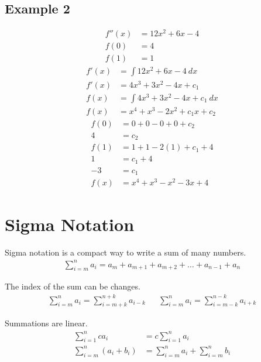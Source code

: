 \documentclass{article}
\theoremstyle{mytheoremstyle}
\theoremstyle{mytheoremstyle}
\theoremstyle{myproblemstyle}
\begin{document}
    \subsection*{Example 2}
    \begin{align*}
        f''(x) &= 12x^2 + 6x - 4 \\
        f(0)   &= 4 \\
        f(1)   &= 1
    \end{align*}
    \begin{align*}
        f'(x) &= \int 12x^2 + 6x - 4 \ dx \\
        f'(x) &= 4x^3 + 3x^2 - 4x + c_1 \\
        f(x)  &= \int 4x^3 + 3x^2 - 4x + c_1 \ dx \\
        f(x)  &= x^4 + x^3 -2x^2 + c_1x + c_2
    \end{align*}
    \begin{align*}
        f(0) &= 0 + 0 - 0 + 0 + c_2 \\
        4    &= c_2 \\
        f(1) &= 1 + 1 - 2(1) + c_1 + 4 \\
        1    &= c_1 + 4 \\
        -3   &=  c_1 \\
        f(x) &= x^4 + x^3 -x^2 - 3x + 4
    \end{align*}


    \section*{Sigma Notation}
    Sigma notation is a compact way to write a sum of many numbers.
    \begin{align*}
        \sum_{i=m}^n a_{i} = a_{m} + a_{m+1} + a_{m+2} + \dots + a_{n-1} + a_{n}
    \end{align*}

    The index of the sum can be changes.
    \begin{align*}
        \sum_{i=m}^{n} a_i = \sum_{i=m+k}^{n+k} a_{i-k} &&
        \sum_{i=m}^{n} a_i = \sum_{i=m-k}^{n-k} a_{i+k}
    \end{align*}

    Summations are linear.
    \begin{align*}
        \sum_{i=1}^{n} ca_i &= c\sum_{i=1}^{n} a_i \\
        \sum_{i=m}^{n} (a_i + b_i) &= \sum_{i=m}^{n} a_i + \sum_{i=m}^{n} b_i \\
    \end{align*}
\end{document}
